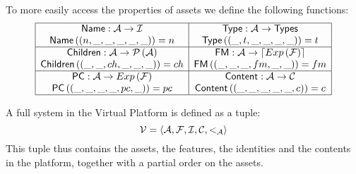 To more easily access the properties of assets we define the following
functions:
\[
  \begin{array}{|c|c|}
    \hline
    {\sf Name} : \mathcal{A} \rightarrow \mathcal{I} & {\sf Type} : \mathcal{A} \rightarrow {\sf Types} \\
    {\sf Name} \left( \left( n, \_, \_, \_, \_, \_ \right) \right) = n & {\sf Type} \left( \left( \_, t, \_, \_, \_, \_ \right) \right) = t \\
    \hline 
    {\sf Children} : \mathcal{A} \rightarrow \mathcal{P} \left(\mathcal{A}\right) & {\sf FM} : \mathcal{A} \rightarrow \lceil Exp \left( \mathcal{F} \right) \rceil \\
    {\sf Children} \left( \left( \_, \_, ch, \_, \_, \_ \right) \right) = ch & {\sf FM} \left( \left( \_, \_, \_, fm, \_, \_ \right) \right) = fm \\
    \hline
    {\sf PC} : \mathcal{A} \rightarrow Exp \left( \mathcal{F} \right) & {\sf Content} : \mathcal{A} \rightarrow \mathcal{C} \\
    {\sf PC} \left( \left( \_, \_, \_, \_, pc, \_ \right) \right) = pc & {\sf Content} \left( \left( \_, \_, \_, \_, \_, c \right) \right) = c \\
    \hline
  \end{array}
\]

A full system in the Virtual Platform is defined as a tuple:
\[
  \mathcal{V} = \left< \mathcal{A} , \mathcal{F} , \mathcal{I} , \mathcal{C}, <_{\mathcal{A}} \right>
\]
This tuple thus contains the assets, the features, the identities and the
contents in the platform, together with a partial order on the assets.

